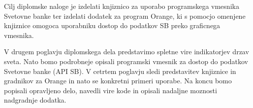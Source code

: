 Cilj diplomske naloge je izdelati knjiznico za uporabo programskega vmesnika
Svetovne banke ter izdelati dodatek za program Orange, ki s pomocjo omenjene
knjiznice omogoca uporabniku dostop do podatkov SB preko graficnega vmesnika.


V drugem poglavju diplomskega dela predstavimo spletne vire indikatorjev
drzav sveta. Nato bomo podrobneje opisali programski vmesnik za dostop do 
podatkov Svetovne banke (API SB). V cetrtem poglavju sledi predstavitev 
knjiznice in gradnikov za Orange in nato se konkretni primeri uporabe. Na koncu
bomo popisali opravljeno delo, navedli vire kode in opisali nadaljne moznosti
nadgradnje dodatka.










                                                                                
                                                                                
                         


